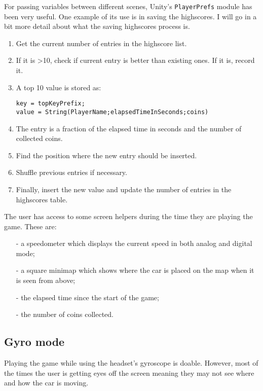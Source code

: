 For passing variables between different scenes, Unity's \texttt{PlayerPrefs} module has been very useful. One example of its use is in saving the highscores. I will go in a bit more detail about what the saving highscores process is.
\begin{enumerate}
	\item Get the current number of entries in the highscore list.
	\item If it is \textgreater  10, check if current entry is better than existing ones. If it is, record it.
	\item A top 10 value is stored as: 
	
	\begin{Verbatim}[frame=single, framesep=3mm]
key = topKeyPrefix;
value = String(PlayerName;elapsedTimeInSeconds;coins)
	\end{Verbatim}
	\item The entry is a fraction of the elapsed time in seconds and the number of collected coins.
	\item Find the position where the new entry should be inserted.
	\item Shuffle previous entries if necessary.
	\item Finally, insert the new value and update the number of entries in the highscores table.
\end{enumerate}

The user has access to some screen helpers during the time they are playing the game. These are:
\begin{itemize}
	\item[-] a speedometer which displays the current speed in both analog and digital mode;
	\item[-] a square minimap which shows where the car is placed on the map when it is seen from above;
	\item[-] the elapsed time since the start of the game;
	\item[-] the number of coins collected.
\end{itemize}

\subsection{Gyro mode}
Playing the game while using the headset's gyroscope is doable. However, most of the times the user is getting eyes off the screen meaning they may not see where and how the car is moving. 
